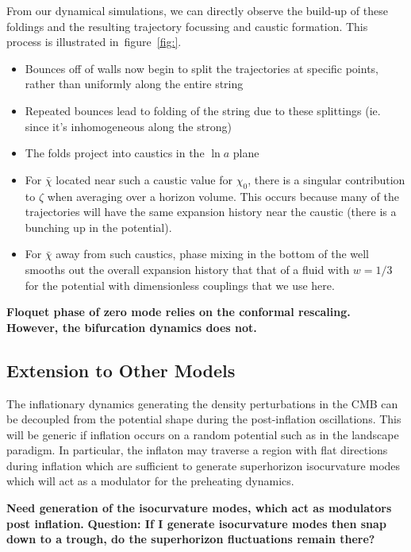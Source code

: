 \documentclass[11pt,a4paper]{article}
\newcommand{\figref}[1]{figure~\ref{#1}}
\begin{document}
From our dynamical simulations, we can directly observe the build-up of these foldings and the resulting trajectory focussing and caustic formation.
This process is illustrated in~\figref{fig:}.

\begin{itemize}
\item Bounces off of walls now begin to split the trajectories at specific points, rather than uniformly along the entire string
\item Repeated bounces lead to folding of the string due to these splittings (ie. since it's inhomogeneous along the strong)
\item The folds project into caustics in the $\ln a$ plane
\item For $\bar{\chi}$ located near such a caustic value for $\chi_0$, there is a singular contribution to $\zeta$ when averaging over a horizon volume.  This occurs because many of the trajectories will have the same expansion history near the caustic (there is a bunching up in the potential).
\item For $\bar{\chi}$ away from such caustics, phase mixing in the bottom of the well smooths out the overall expansion history that that of a fluid with $w=1/3$ for the potential with dimensionless couplings that we use here.
\end{itemize}
{\bf Floquet phase of zero mode relies on the conformal rescaling.  However, the bifurcation dynamics does not.}

\subsection{Extension to Other Models}
The inflationary dynamics generating the density perturbations in the CMB can be decoupled from the potential shape during the post-inflation oscillations.
This will be generic if inflation occurs on a random potential such as in the landscape paradigm.
In particular, the inflaton may traverse a region with flat directions during inflation which are sufficient to generate superhorizon isocurvature modes which will act as a modulator for the preheating dynamics.

{\bf Need generation of the isocurvature modes, which act as modulators post inflation.}
{\bf Question: If I generate isocurvature modes then snap down to a trough, do the superhorizon fluctuations remain there?}
\end{document}
